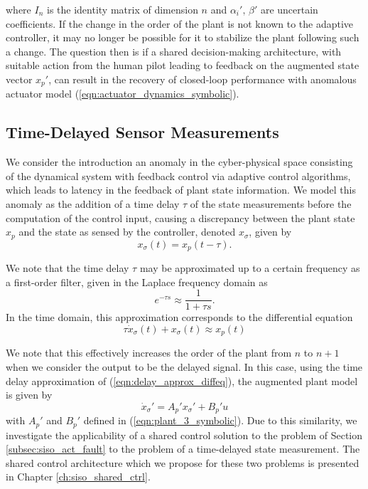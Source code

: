where $I_n$ is the identity matrix of dimension $n$ and $\alpha_i', \, \beta'$ are uncertain coefficients. If the change in the order of the plant is not known to the adaptive controller, it may no longer be possible for it to stabilize the plant following such a change. The question then is if a shared decision-making architecture, with suitable action from the human pilot leading to feedback on the augmented state vector $x_p'$, can result in the recovery of closed-loop performance with anomalous actuator model (\ref{eqn:actuator_dynamics_symbolic}).

\subsection{Time-Delayed Sensor Measurements} \label{subsec:siso_delay}
We consider the introduction an anomaly in the cyber-physical space consisting of the dynamical system with feedback control via adaptive control algorithms, which leads to latency in the feedback of plant state information. We model this anomaly as the addition of a time delay $\tau$ of the state measurements before the computation of the control input, causing a discrepancy between the plant state $x_p$ and the state as sensed by the controller, denoted $x_\sigma$, given by
\begin{equation}
	x_\sigma(t) = x_p(t - \tau). \label{eqn:delay_approx_diffeq}
\end{equation}

We note that the time delay $\tau$ may be approximated up to a certain frequency as a first-order filter, given in the Laplace frequency domain as
\begin{equation}
	e^{-\tau s} \approx \frac{1}{1 + \tau s}.
\end{equation}
In the time domain, this approximation corresponds to the differential equation
\begin{equation}
	\tau \dot{x}_{\sigma}(t) + x_{\sigma}(t) \approx x_p(t)	
\end{equation}

We note that this effectively increases the order of the plant from $n$ to $n+1$ when we consider the output to be the delayed signal. In this case, using the time delay approximation of (\ref{eqn:delay_approx_diffeq}), the augmented plant model is given by
\begin{equation}
	\dot{x}_\sigma' = A_p' x_\sigma' + B_p' u \label{eqn:plant_3_tau}
\end{equation}
with $A_p'$ and $B_p'$ defined in (\ref{eqn:plant_3_symbolic}). Due to this similarity, we investigate the applicability of a shared control solution to the problem of Section \ref{subsec:siso_act_fault} to the problem of a time-delayed state measurement. The shared control architecture which we propose for these two problems is presented in Chapter \ref{ch:siso_shared_ctrl}.


